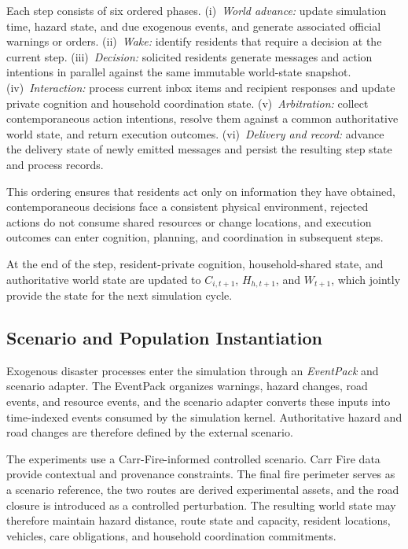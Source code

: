 \documentclass[journal]{IEEEtran}
\begin{document}
Each step consists of six ordered phases.
(i)~\emph{World advance:} update simulation time, hazard state, and due
exogenous events, and generate associated official warnings or orders.
(ii)~\emph{Wake:} identify residents that require a decision at the current
step. (iii)~\emph{Decision:} solicited residents generate messages and action
intentions in parallel against the same immutable world-state snapshot.
(iv)~\emph{Interaction:} process current inbox items and recipient responses
and update private cognition and household coordination state.
(v)~\emph{Arbitration:} collect contemporaneous action intentions, resolve them
against a common authoritative world state, and return execution outcomes.
(vi)~\emph{Delivery and record:} advance the delivery state of newly emitted
messages and persist the resulting step state and process records.

This ordering ensures that residents act only on information they have obtained,
contemporaneous decisions face a consistent physical environment, rejected
actions do not consume shared resources or change locations, and execution
outcomes can enter cognition, planning, and coordination in subsequent steps.

At the end of the step, resident-private cognition, household-shared state, and
authoritative world state are updated to $C_{i,t+1}$, $H_{h,t+1}$, and
$W_{t+1}$, which jointly provide the state for the next simulation cycle.

\subsection{Scenario and Population Instantiation}

Exogenous disaster processes enter the simulation through an \emph{EventPack}
and scenario adapter. The EventPack organizes warnings, hazard changes, road
events, and resource events, and the scenario adapter converts these inputs into
time-indexed events consumed by the simulation kernel. Authoritative hazard and
road changes are therefore defined by the external scenario.

The experiments use a Carr-Fire-informed controlled scenario. Carr Fire data
provide contextual and provenance constraints. The final fire perimeter serves
as a scenario reference, the two routes are derived experimental assets, and the
road closure is introduced as a controlled perturbation. The resulting world
state may therefore maintain hazard distance, route state and capacity,
resident locations, vehicles, care obligations, and household coordination
commitments.
\end{document}
